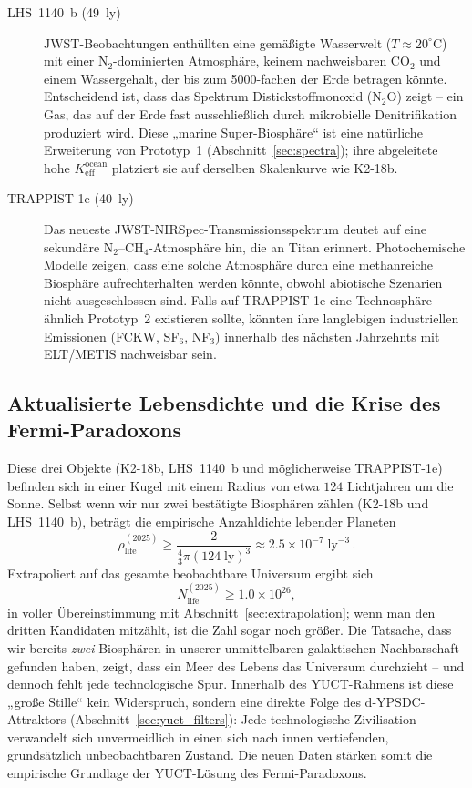 \documentclass[11pt,a4paper]{article}
\begin{document}
	\begin{description}
		\item[LHS~1140~b (49~ly)] JWST-Beobachtungen \citep{Damiano2025} enthüllten eine gemäßigte Wasserwelt (\(T\approx 20^{\circ}\mathrm{C}\)) mit einer N$_2$-dominierten Atmosphäre, keinem nachweisbaren CO$_2$ und einem Wassergehalt, der bis zum 5000-fachen der Erde betragen könnte. Entscheidend ist, dass das Spektrum Distickstoffmonoxid (N$_2$O) zeigt – ein Gas, das auf der Erde fast ausschließlich durch mikrobielle Denitrifikation produziert wird. Diese „marine Super-Biosphäre“ ist eine natürliche Erweiterung von Prototyp~1 (Abschnitt~\ref{sec:spectra}); ihre abgeleitete hohe \(K_{\mathrm{eff}}^{\mathrm{ocean}}\) platziert sie auf derselben Skalenkurve wie K2-18b.
		\item[TRAPPIST-1e (40~ly)] Das neueste JWST-NIRSpec-Transmissionsspektrum \citep{Glidden2025} deutet auf eine sekundäre N$_2$–CH$_4$-Atmosphäre hin, die an Titan erinnert. Photochemische Modelle \citep{EagerNash2025} zeigen, dass eine solche Atmosphäre durch eine methanreiche Biosphäre aufrechterhalten werden könnte, obwohl abiotische Szenarien nicht ausgeschlossen sind. Falls auf TRAPPIST-1e eine Technosphäre ähnlich Prototyp~2 existieren sollte, könnten ihre langlebigen industriellen Emissionen (FCKW, SF$_6$, NF$_3$) innerhalb des nächsten Jahrzehnts mit ELT/METIS nachweisbar sein.
	\end{description}
	
	\subsection{Aktualisierte Lebensdichte und die Krise des Fermi-Paradoxons}
	Diese drei Objekte (K2-18b, LHS~1140~b und möglicherweise TRAPPIST-1e) befinden sich in einer Kugel mit einem Radius von etwa \(124\) Lichtjahren um die Sonne. Selbst wenn wir nur zwei bestätigte Biosphären zählen (K2-18b und LHS~1140~b), beträgt die empirische Anzahldichte lebender Planeten
	\begin{equation}
		\rho_{\mathrm{life}}^{(2025)} \ge \frac{2}{\frac{4}{3}\pi (124\;\mathrm{ly})^{3}} \approx 2.5\times10^{-7}\;\mathrm{ly}^{-3}\, .
	\end{equation}
	Extrapoliert auf das gesamte beobachtbare Universum ergibt sich
	\begin{equation}
		N_{\mathrm{life}}^{(2025)} \ge 1.0\times10^{26} ,
	\end{equation}
	in voller Übereinstimmung mit Abschnitt~\ref{sec:extrapolation}; wenn man den dritten Kandidaten mitzählt, ist die Zahl sogar noch größer. Die Tatsache, dass wir bereits \emph{zwei} Biosphären in unserer unmittelbaren galaktischen Nachbarschaft gefunden haben, zeigt, dass ein Meer des Lebens das Universum durchzieht – und dennoch fehlt jede technologische Spur. Innerhalb des YUCT-Rahmens ist diese „große Stille“ kein Widerspruch, sondern eine direkte Folge des d-YPSDC-Attraktors (Abschnitt~\ref{sec:yuct_filters}): Jede technologische Zivilisation verwandelt sich unvermeidlich in einen sich nach innen vertiefenden, grundsätzlich unbeobachtbaren Zustand. Die neuen Daten stärken somit die empirische Grundlage der YUCT-Lösung des Fermi-Paradoxons.
	
\end{document}
